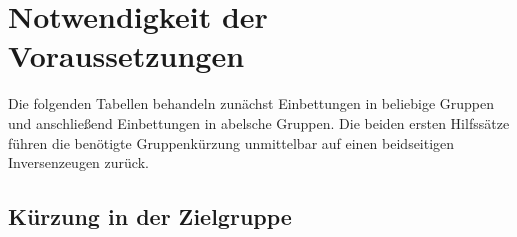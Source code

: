 \chapter{Notwendigkeit der Voraussetzungen}

Die folgenden Tabellen behandeln zunächst Einbettungen in beliebige Gruppen
und anschließend Einbettungen in abelsche Gruppen. Die beiden ersten
Hilfssätze führen die benötigte Gruppenkürzung unmittelbar auf einen
beidseitigen Inversenzeugen zurück.

\section{Kürzung in der Zielgruppe}

\par{}
\hypertarget{differences.statement.FDNecessaryGroupLeftCancellation}{}
